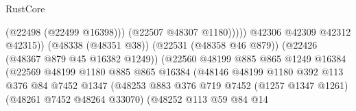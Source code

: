 \begin{lexlean}{RustCore}
\begin{coremodule}
                                                              (@22498 (@22499 @16398)))
                                                            (@22507 @48307 @1180)))))
                                                    @42306
                                                    @42309
                                                    @42312
                                                    @42315))
                                                (@48338 (@48351 @38))
                                                (@22531 (@48358 @46 @879))
                                                (@22426 (@48367 @879 @45 @16382 @1249))
                                                (@22560
                                                  @48199
                                                  @885
                                                  @865
                                                  @1249
                                                  @16384
                                                  (@22569
                                                    @48199
                                                    @1180
                                                    @885
                                                    @865
                                                    @16384
                                                    (@48146
                                                      @48199
                                                      @1180
                                                      @392
                                                      @113
                                                      @376
                                                      @84
                                                      @7452
                                                      @1347
                                                      (@48253
                                                        @883
                                                        @376
                                                        @719
                                                        @7452
                                                        (@1257 @1347 @1261)
                                                        (@48261 @7452 @48264 @33070)
                                                        (@48252
                                                          @113
                                                          @59
                                                          @84
                                                          @14

\end{coremodule}
\end{lexlean}
